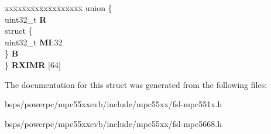 \begin{DoxyCompactItemize}
\begin{tabbing}
\end{tabbing}\item 
\mbox{\label{structFLEXCAN__tag_a7684450ede003999485a39b68767e317}} 
\begin{tabbing}
xx\=xx\=xx\=xx\=xx\=xx\=xx\=xx\=xx\=\kill
union \{\\
\>uint32\_t {\bfseries R}\\
\>struct \{\\
\>\>uint32\_t {\bfseries MI}:32\\
\>\} {\bfseries B}\\
\} {\bfseries RXIMR} \mbox{[}64\mbox{]}\\

\end{tabbing}\end{DoxyCompactItemize}


The documentation for this struct was generated from the following files\+:\begin{DoxyCompactItemize}
\item 
bsps/powerpc/mpc55xxevb/include/mpc55xx/fsl-\/mpc551x.\+h\item 
bsps/powerpc/mpc55xxevb/include/mpc55xx/fsl-\/mpc5668.\+h\end{DoxyCompactItemize}
